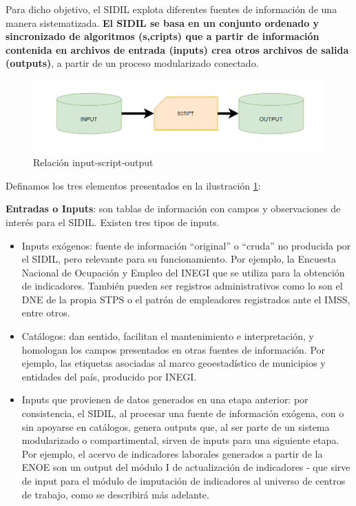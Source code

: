 \documentclass[
]{article}
\begin{document}
Para dicho objetivo, el SIDIL explota diferentes fuentes de información de una manera sistematizada. \textbf{El SIDIL se basa en un conjunto ordenado y sincronizado de algoritmos (s,cripts) que a partir de información contenida en archivos de entrada (inputs) crea otros archivos de salida (outputs)}, a partir de un proceso modularizado conectado.

\begin{figure}
\includegraphics[width=0.5\linewidth]{images-1/02/script_input_output} \caption{Relación input-script-output}\label{fig:scriptinputoutput}
\end{figure}

Definamos los tres elementos presentados en la ilustración \ref{fig:scriptinputoutput}:

\textbf{Entradas o Inputs}: son tablas de información con campos y observaciones de interés para el SIDIL. Existen tres tipos de inputs.

\begin{itemize}
\item
  Inputs exógenos: fuente de información ``original'' o ``cruda'' no producida por el SIDIL, pero relevante para su funcionamiento. Por ejemplo, la Encuesta Nacional de Ocupación y Empleo del INEGI que se utiliza para la obtención de indicadores. También pueden ser registros administrativos como lo son el DNE de la propia STPS o el patrón de empleadores registrados ante el IMSS, entre otros.
\item
  Catálogos: dan sentido, facilitan el mantenimiento e interpretación, y homologan los campos presentados en otras fuentes de información. Por ejemplo, las etiquetas asociadas al marco geoestadístico de municipios y entidades del país, producido por INEGI.
\item
  Inputs que provienen de datos generados en una etapa anterior: por consistencia, el SIDIL, al procesar una fuente de información exógena, con o sin apoyarse en catálogos, genera outputs que, al ser parte de un sistema modularizado o compartimental, sirven de inputs para una siguiente etapa. Por ejemplo, el acervo de indicadores laborales generados a partir de la ENOE son un output del módulo I de actualización de indicadores - que sirve de input para el módulo de imputación de indicadores al universo de centros de trabajo, como se describirá más adelante.
\end{itemize}
\end{document}
